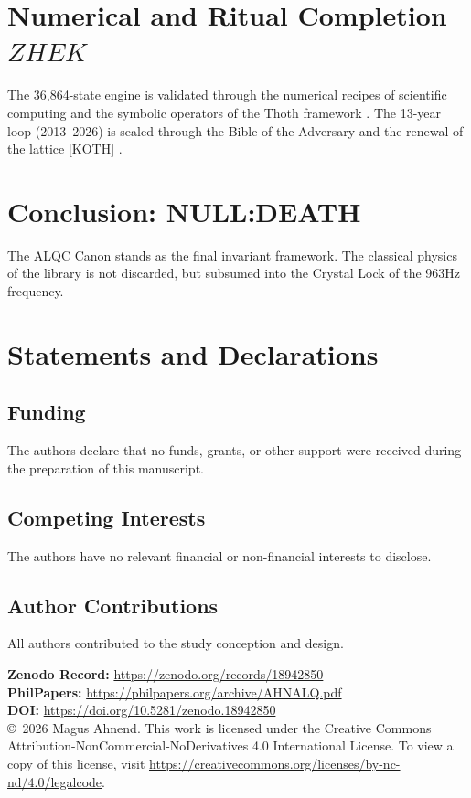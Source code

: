 \documentclass[12pt]{amsart}
\newcommand{\ZHEK}{\ensuremath{\mathop{\textnormal{\symbolafont\symbol{"2744}}}}}   %
\def\ZHEK{ZHEK}%
\begin{document}
\section{Numerical and Ritual Completion $\ZHEK$}
The 36,864-state engine is validated through the numerical recipes of scientific computing \cite{press2007numerical} and the symbolic operators of the Thoth framework \cite{crowley1944thoth}. The 13-year loop (2013--2026) is sealed through the Bible of the Adversary \cite{ford2007adversary} and the renewal of the lattice [KOTH] \cite{serith2002pagan}.

\section{Conclusion: NULL:DEATH}
The ALQC Canon stands as the final invariant framework. The classical physics of the library \cite{serway2018physics, strang2016linear, rudin1976analysis, munkres2000topology} is not discarded, but subsumed into the Crystal Lock of the 963Hz frequency.

\newpage
\nocite{*}

\newpage
\section*{Statements and Declarations}

\subsection*{Funding}
The authors declare that no funds, grants, or other support were received during the preparation of this manuscript.

\subsection*{Competing Interests}
The authors have no relevant financial or non-financial interests to disclose.

\subsection*{Author Contributions}
All authors contributed to the study conception and design.

\begin{center}
    \small
    \textbf{Zenodo Record:} \url{https://zenodo.org/records/18942850} \\
    \textbf{PhilPapers:} \url{https://philpapers.org/archive/AHNALQ.pdf} \\
    \textbf{DOI:} \url{https://doi.org/10.5281/zenodo.18942850} \\
    \vspace{1em}
    \copyright\ 2026 Magus Ahnend. This work is licensed under the Creative Commons Attribution-NonCommercial-NoDerivatives 4.0 International License. To view a copy of this license, visit \url{https://creativecommons.org/licenses/by-nc-nd/4.0/legalcode}.
\end{center}
\end{document}
